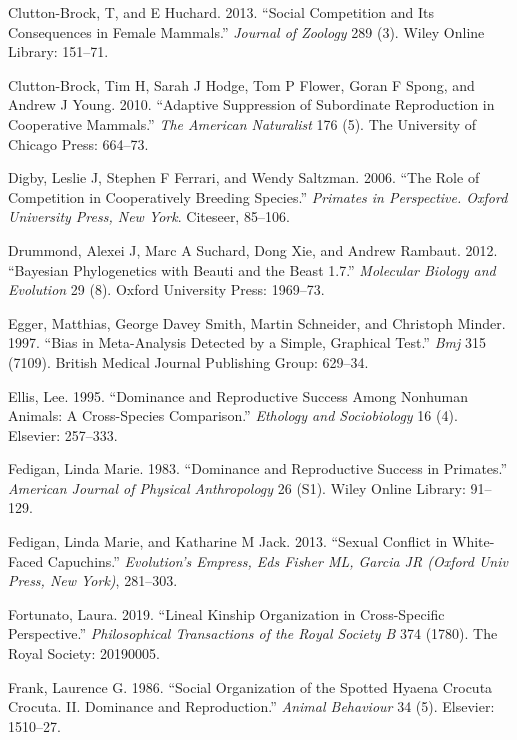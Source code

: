 \documentclass[]{article}
\begin{document}
\leavevmode\hypertarget{ref-clutton2013social}{}%
Clutton-Brock, T, and E Huchard. 2013. ``Social Competition and Its
Consequences in Female Mammals.'' \emph{Journal of Zoology} 289 (3).
Wiley Online Library: 151--71.

\leavevmode\hypertarget{ref-clutton2010adaptive}{}%
Clutton-Brock, Tim H, Sarah J Hodge, Tom P Flower, Goran F Spong, and
Andrew J Young. 2010. ``Adaptive Suppression of Subordinate Reproduction
in Cooperative Mammals.'' \emph{The American Naturalist} 176 (5). The
University of Chicago Press: 664--73.

\leavevmode\hypertarget{ref-digby2006role}{}%
Digby, Leslie J, Stephen F Ferrari, and Wendy Saltzman. 2006. ``The Role
of Competition in Cooperatively Breeding Species.'' \emph{Primates in
Perspective. Oxford University Press, New York}. Citeseer, 85--106.

\leavevmode\hypertarget{ref-drummond2012bayesian}{}%
Drummond, Alexei J, Marc A Suchard, Dong Xie, and Andrew Rambaut. 2012.
``Bayesian Phylogenetics with Beauti and the Beast 1.7.''
\emph{Molecular Biology and Evolution} 29 (8). Oxford University Press:
1969--73.

\leavevmode\hypertarget{ref-egger1997bias}{}%
Egger, Matthias, George Davey Smith, Martin Schneider, and Christoph
Minder. 1997. ``Bias in Meta-Analysis Detected by a Simple, Graphical
Test.'' \emph{Bmj} 315 (7109). British Medical Journal Publishing Group:
629--34.

\leavevmode\hypertarget{ref-ellis1995dominance}{}%
Ellis, Lee. 1995. ``Dominance and Reproductive Success Among Nonhuman
Animals: A Cross-Species Comparison.'' \emph{Ethology and Sociobiology}
16 (4). Elsevier: 257--333.

\leavevmode\hypertarget{ref-fedigan1983dominance}{}%
Fedigan, Linda Marie. 1983. ``Dominance and Reproductive Success in
Primates.'' \emph{American Journal of Physical Anthropology} 26 (S1).
Wiley Online Library: 91--129.

\leavevmode\hypertarget{ref-fedigan2013sexual}{}%
Fedigan, Linda Marie, and Katharine M Jack. 2013. ``Sexual Conflict in
White-Faced Capuchins.'' \emph{Evolution's Empress, Eds Fisher ML,
Garcia JR (Oxford Univ Press, New York)}, 281--303.

\leavevmode\hypertarget{ref-fortunato2019lineal}{}%
Fortunato, Laura. 2019. ``Lineal Kinship Organization in Cross-Specific
Perspective.'' \emph{Philosophical Transactions of the Royal Society B}
374 (1780). The Royal Society: 20190005.

\leavevmode\hypertarget{ref-frank1986social}{}%
Frank, Laurence G. 1986. ``Social Organization of the Spotted Hyaena
Crocuta Crocuta. II. Dominance and Reproduction.'' \emph{Animal
Behaviour} 34 (5). Elsevier: 1510--27.
\end{document}
